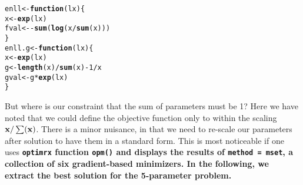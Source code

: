 \documentclass[11pt]{article}\usepackage[]{graphicx}\usepackage[]{color}
\makeatletter
\newcommand{\hlnum}[1]{\textcolor[rgb]{0.686,0.059,0.569}{#1}}%
\newcommand{\hlopt}[1]{\textcolor[rgb]{0,0,0}{#1}}%
\newcommand{\hlstd}[1]{\textcolor[rgb]{0.345,0.345,0.345}{#1}}%
\newcommand{\hlkwa}[1]{\textcolor[rgb]{0.161,0.373,0.58}{\textbf{#1}}}%
\newcommand{\hlkwb}[1]{\textcolor[rgb]{0.69,0.353,0.396}{#1}}%
\newcommand{\hlkwc}[1]{\textcolor[rgb]{0.333,0.667,0.333}{#1}}%
\newcommand{\hlkwd}[1]{\textcolor[rgb]{0.737,0.353,0.396}{\textbf{#1}}}%
\newenvironment{kframe}{%
 \def\at@end@of@kframe{}%
 \ifinner\ifhmode%
  \def\at@end@of@kframe{\end{minipage}}%
  \begin{minipage}{\columnwidth}%
 \fi\fi%
 \def\FrameCommand##1{\hskip\@totalleftmargin \hskip-\fboxsep
 \colorbox{shadecolor}{##1}\hskip-\fboxsep
     \hskip-\linewidth \hskip-\@totalleftmargin \hskip\columnwidth}%
 \MakeFramed {\advance\hsize-\width
   \@totalleftmargin\z@ \linewidth\hsize
   \@setminipage}}%
 {\par\unskip\endMakeFramed%
 \at@end@of@kframe}
\newenvironment{knitrout}{}{} %
\newcommand{\B}[1]{{\bf #1 \rm}}
\newcommand{\code}[1]{{\tt#1}}
\newcommand{\pkg}[1]{\bf{\tt#1}\rm }
\makeatother
\begin{document}
\begin{knitrout}\scriptsize
{}\color{fgcolor}\begin{kframe}
\begin{alltt}
\hlstd{enll} \hlkwb{<-} \hlkwa{function}\hlstd{(}\hlkwc{lx}\hlstd{) \{}
    \hlstd{x}\hlkwb{<-}\hlkwd{exp}\hlstd{(lx)}
    \hlstd{fval}\hlkwb{<-}  \hlopt{-} \hlkwd{sum}\hlstd{(} \hlkwd{log}\hlstd{( x}\hlopt{/}\hlkwd{sum}\hlstd{(x) ) )}
\hlstd{\}}
\hlstd{enll.g} \hlkwb{<-} \hlkwa{function}\hlstd{(}\hlkwc{lx}\hlstd{)\{}
    \hlstd{x}\hlkwb{<-}\hlkwd{exp}\hlstd{(lx)}
    \hlstd{g}\hlkwb{<-}\hlkwd{length}\hlstd{(x)}\hlopt{/}\hlkwd{sum}\hlstd{(x)} \hlopt{-} \hlnum{1}\hlopt{/}\hlstd{x}
    \hlstd{gval}\hlkwb{<-}\hlstd{g}\hlopt{*}\hlkwd{exp}\hlstd{(lx)}
\hlstd{\}}
\end{alltt}
\end{kframe}
\end{knitrout}

But where is our constraint that the sum of parameters must be 1? 
Here we have noted that we could define the objective 
function only to within the scaling  $\B{x}/\sum(\B{x})$. There is a minor 
nuisance, in that we need to re-scale our 
parameters after solution to have them in a standard form. 
This is most noticeable if one uses \pkg{optimrx} function \code{opm()}
and displays the results of \code{method = mset}, a collection of six
gradient-based minimizers. In the following, we
extract the best solution for the 5-parameter problem.
\end{document}
